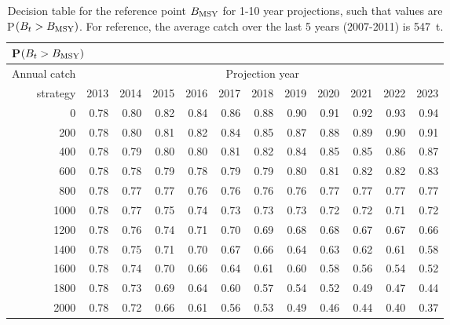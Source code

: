 \begin{table}[tbp]
\begin{center}
\caption{Decision table for the reference point $B_\mathrm{MSY}$ for 1-10 year projections, such that values are P$(B_t > B_\mathrm{MSY})$. For reference, the average catch over the last 5 years (2007-2011) is 547~t.}
\label{tab:Bmsy10}
\begin{tabular}{rrrrrrrrrrrr}
\multicolumn{12}{l}{P$(B_t > B_\mathrm{MSY})$} \\
\hline
Annual catch & \multicolumn{11}{c}{Projection year} \\
\cline{2-12}
strategy & 2013 & 2014 & 2015 & 2016 & 2017 & 2018 & 2019 & 2020 & 2021 & 2022 & 2023 \\ 
  \hline
0 & 0.78 & 0.80 & 0.82 & 0.84 & 0.86 & 0.88 & 0.90 & 0.91 & 0.92 & 0.93 & 0.94 \\ 
  200 & 0.78 & 0.80 & 0.81 & 0.82 & 0.84 & 0.85 & 0.87 & 0.88 & 0.89 & 0.90 & 0.91 \\ 
  400 & 0.78 & 0.79 & 0.80 & 0.80 & 0.81 & 0.82 & 0.84 & 0.85 & 0.85 & 0.86 & 0.87 \\ 
  600 & 0.78 & 0.78 & 0.79 & 0.78 & 0.79 & 0.79 & 0.80 & 0.81 & 0.82 & 0.82 & 0.83 \\ 
  800 & 0.78 & 0.77 & 0.77 & 0.76 & 0.76 & 0.76 & 0.76 & 0.77 & 0.77 & 0.77 & 0.77 \\ 
  1000 & 0.78 & 0.77 & 0.75 & 0.74 & 0.73 & 0.73 & 0.73 & 0.72 & 0.72 & 0.71 & 0.72 \\ 
  1200 & 0.78 & 0.76 & 0.74 & 0.71 & 0.70 & 0.69 & 0.68 & 0.68 & 0.67 & 0.67 & 0.66 \\ 
  1400 & 0.78 & 0.75 & 0.71 & 0.70 & 0.67 & 0.66 & 0.64 & 0.63 & 0.62 & 0.61 & 0.58 \\ 
  1600 & 0.78 & 0.74 & 0.70 & 0.66 & 0.64 & 0.61 & 0.60 & 0.58 & 0.56 & 0.54 & 0.52 \\ 
  1800 & 0.78 & 0.73 & 0.69 & 0.64 & 0.60 & 0.57 & 0.54 & 0.52 & 0.49 & 0.47 & 0.44 \\ 
  2000 & 0.78 & 0.72 & 0.66 & 0.61 & 0.56 & 0.53 & 0.49 & 0.46 & 0.44 & 0.40 & 0.37 \\ 
   \hline
\end{tabular}
\end{center}
\end{table}%
